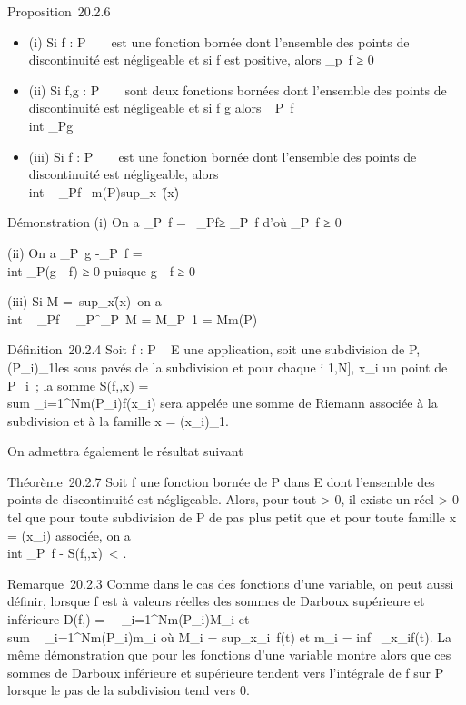 \documentclass[]{article}
\begin{document}
Proposition~20.2.6

\begin{itemize}
\itemsep1pt\parskip0pt
\item
  (i) Si f : P \rightarrow~ ~ est une fonction bornée dont l'ensemble des points de
  discontinuité est négligeable et si f est positive, alors
  \int  _p~f ≥ 0
\item
  (ii) Si f,g : P \rightarrow~ ~ sont deux fonctions bornées dont l'ensemble des
  points de discontinuité est négligeable et si f \leq g alors
  \int  _P~f \leq\\int
   _Pg
\item
  (iii) Si f : P \rightarrow~ ~ est une fonction bornée dont l'ensemble des points
  de discontinuité est négligeable, alors
  \\int ~
  _Pf\ \leq
  m(P)sup_x\inP~\f(x)\.
\end{itemize}

Démonstration (i) On a \int  _P~f
=\int ~
_Pf≥\left
\int  _P~f\right
 d'où \int  _P~f ≥ 0

(ii) On a \int  _P~g
-\int  _P~f =\\int
 _P(g - f) ≥ 0 puisque g - f ≥ 0

(iii) Si M =\
sup_x\inP\f(x)\,
on a \\int ~
_Pf\ \leq\int ~
_P\f\
\leq\int  _P~M =
M\int  _P~1 = Mm(P)

Définition~20.2.4 Soit f : P \rightarrow~ E une application, soit \sigma une subdivision
de P, (P_i)_1\leqi\leqN les sous pavés de la subdivision et
pour chaque i \in {[}1,N{]}, x_i un point de P_i~; la
somme S(f,\sigma,x) =\ \\sum
 _i=1^Nm(P_i)f(x_i) sera appelée une
somme de Riemann associée à la subdivision \sigma et à la famille x =
(x_i)_1\leqi\leqN.

On admettra également le résultat suivant

Théorème~20.2.7 Soit f une fonction bornée de P dans E dont l'ensemble
des points de discontinuité est négligeable. Alors, pour tout \epsilon
\textgreater{} 0, il existe un réel \eta \textgreater{} 0 tel que pour
toute subdivision \sigma de P de pas plus petit que \eta et pour toute famille x
= (x_i) associée, on a
\\int  _P~f -
S(f,\sigma,x)\ \textless{} \epsilon.

Remarque~20.2.3 Comme dans le cas des fonctions d'une variable, on peut
aussi définir, lorsque f est à valeurs réelles des sommes de Darboux
supérieure et inférieure D(f,\sigma) =\
\sum ~
_i=1^Nm(P_i)M_i et
\\sum ~
_i=1^Nm(P_i)m_i où M_i
= sup_x\inP_i~f(t) et
m_i = inf~
_x\inP_if(t). La même démonstration que pour les fonctions
d'une variable montre alors que ces sommes de Darboux inférieure et
supérieure tendent vers l'intégrale de f sur P lorsque le pas de la
subdivision tend vers 0.
\end{document}
